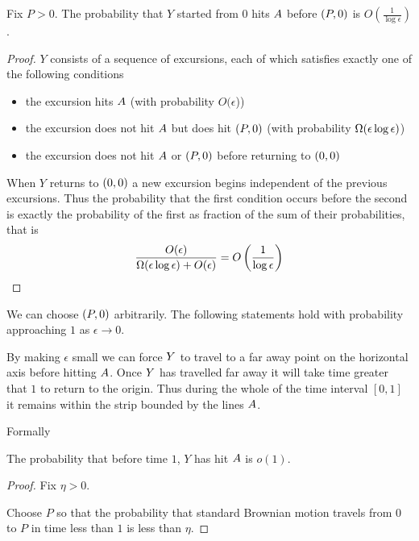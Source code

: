 {\begin{lemma}
  Fix $P > 0$.  The probability that $Y$ started from $0$ hits
  $A$ before $(P,0)$ is $O(\frac{1}{\log\epsilon})$.
\end{lemma}

\newcommand{\Oe}{O(\epsilon)}

\begin{proof}
  $Y$ consists of a sequence of excursions, each of which satisfies
  exactly one of the following conditions
  \begin{itemize}
  \item the excursion hits $A$ (with probability
    $O(\epsilon$))
  \item the excursion does not hit $A$ but does hit
    $(P,0)$ (with probability $\Omega(\epsilon\log\epsilon)$)
  \item the excursion does not hit $A$ or $(P,0)$ before
    returning to $(0,0)$
  \end{itemize}
  When $Y$ returns to $(0,0)$ a new excursion begins independent of
  the previous excursions.  Thus the probability that the first
  condition occurs before the second is exactly the probability of the
  first as fraction of the sum of their probabilities, that is
  \[
  \frac{\Oe}{\Omegaeloge + \Oe} = O\left(\frac{1}{\log\epsilon}\right)
  \]
\end{proof}

We can choose $(P,0)$ arbitrarily.  The following statements hold
with probability approaching $1$ as $\epsilon \to 0$.

By making $\epsilon$ small we can force $Y$ to travel to a far
away point on the horizontal axis before hitting $A$.
Once $Y$ has travelled far away it will take time greater that
$1$ to return to the origin.  Thus during the whole of the time
interval $[0,1]$ it remains within the strip bounded by the lines
$A$.

Formally

\begin{lemma}
  The probability that before time $1$, $Y$ has hit $A$
  is $o(1)$.
\end{lemma}

\begin{proof}
  Fix $\eta > 0$.

  Choose $P$ so that the probability that standard Brownian motion
  travels from $0$ to $P$ in time less than $1$ is less than
  $\eta$.


\end{proof}}
